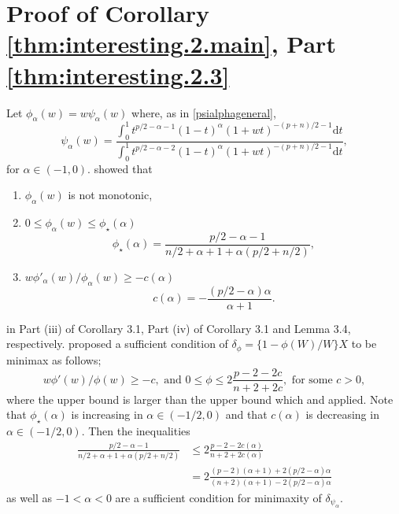 \documentclass[preprint,11pt]{imsart}
\numberwithin{equation}{section}
\theoremstyle{plain}
\theoremstyle{definition}
\theoremstyle{remark}
\newcommand{\rd}{\mathrm{d}}
\begin{document}
\section{Proof of Corollary \ref{thm:interesting.2.main}, Part \ref{thm:interesting.2.3}}
\label{sec.ap.alam}
Let $ \phi_\alpha(w)=w\psi_\alpha(w)$ where, as in \eqref{psialphageneral}, 
\begin{equation*}
\psi_\alpha(w)=
  \frac{\int_0^1 t^{p/2-\alpha-1}(1-t)^{\alpha}(1+wt)^{-(p+n)/2-1}\rd t}
  {\int_0^1 t^{p/2-\alpha-2}(1-t)^{\alpha}(1+wt)^{-(p+n)/2-1}\rd t},
\end{equation*}
for $\alpha\in(-1,0)$. \cite{Maruyama-Strawderman-2009} showed that
\begin{enumerate}
 \item $\phi_\alpha(w)$ is not monotonic, 
 \item $ 0\leq \phi_\alpha(w)\leq \phi_\star(\alpha)$ 
\begin{equation*}
 \phi_\star(\alpha)=\frac{p/2-\alpha-1}{n/2+\alpha+1+\alpha(p/2+n/2)},
\end{equation*}
 \item $w\phi'_\alpha(w)/\phi_\alpha(w)\geq -c(\alpha)$ 
\begin{equation*}
 c(\alpha)=-\frac{(p/2-\alpha)\alpha}{\alpha+1}.
\end{equation*}
\end{enumerate}
in Part (iii) of Corollary 3.1, Part (iv) of Corollary 3.1 and Lemma 3.4, respectively.
\cite{Kubokawa-2009} proposed a sufficient condition of $\delta_\phi=\{1-\phi(W)/W\}X$
to be minimax as follows;
\begin{equation*}
 w\phi'(w)/\phi(w)\geq -c,\text{ and }0\leq \phi\leq 2\frac{p-2-2c}{n+2+2c},
  \text{ for some }c>0,
\end{equation*}
where the upper bound is larger than the upper bound which \cite{Maruyama-Strawderman-2009}
and \cite{Wells-Zhou-2008} applied.
Note that $\phi_\star(\alpha)$ is increasing in $\alpha\in(-1/2,0)$
and that $c(\alpha)$ is decreasing in $\alpha\in(-1/2,0)$.
Then the inequalities
\begin{equation*}
\begin{split}
 \frac{p/2-\alpha-1}{n/2+\alpha+1+\alpha(p/2+n/2)}&\leq 2\frac{p-2-2c(\alpha)}{n+2+2c(\alpha)}\\
&  =2\frac{(p-2)(\alpha+1)+2(p/2-\alpha)\alpha}{(n+2)(\alpha+1)-2(p/2-\alpha)\alpha}
\end{split} 
\end{equation*}
as well as $ -1<\alpha<0$ are a sufficient condition for minimaxity of $\delta_{\psi_\alpha}$.
\end{document}
